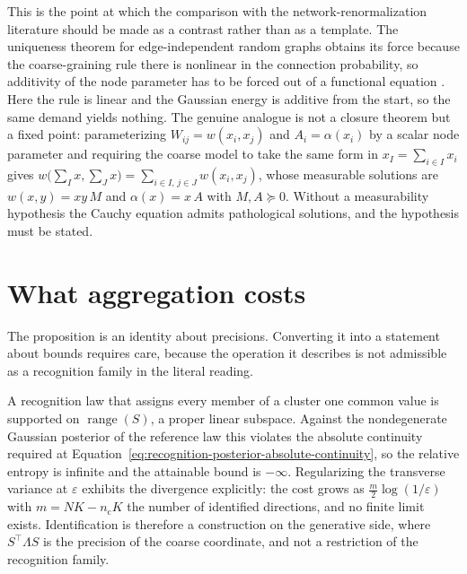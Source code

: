 This is the point at which the comparison with the network-renormalization literature should be made as a contrast rather than as a template. The uniqueness theorem for edge-independent random graphs obtains its force because the coarse-graining rule there is nonlinear in the connection probability, so additivity of the node parameter has to be forced out of a functional equation \citep{Garuccio2023Multiscale}. Here the rule is linear and the Gaussian energy is additive from the start, so the same demand yields nothing. The genuine analogue is not a closure theorem but a fixed point: parameterizing \(W_{ij}=w(x_i,x_j)\) and \(A_i=\alpha(x_i)\) by a scalar node parameter and requiring the coarse model to take the same form in \(x_I=\sum_{i\in I}x_i\) gives \(w\bigl(\sum_{I}x,\sum_{J}x\bigr)=\sum_{i\in I,\,j\in J}w(x_i,x_j)\), whose measurable solutions are \(w(x,y)=xy\,M\) and \(\alpha(x)=x\,A\) with \(M,A\succeq 0\). Without a measurability hypothesis the Cauchy equation admits pathological solutions, and the hypothesis must be stated.

\section{What aggregation costs}

The proposition is an identity about precisions. Converting it into a statement about bounds requires care, because the operation it describes is not admissible as a recognition family in the literal reading.

A recognition law that assigns every member of a cluster one common value is supported on \(\operatorname{range}(S)\), a proper linear subspace. Against the nondegenerate Gaussian posterior of the reference law this violates the absolute continuity required at Equation~\eqref{eq:recognition-posterior-absolute-continuity}, so the relative entropy is infinite and the attainable bound is \(-\infty\). Regularizing the transverse variance at \(\varepsilon\) exhibits the divergence explicitly: the cost grows as \(\tfrac{m}{2}\log(1/\varepsilon)\) with \(m=NK-n_{\mathrm{c}}K\) the number of identified directions, and no finite limit exists. Identification is therefore a construction on the generative side, where \(S^{\top}\Lambda S\) is the precision of the coarse coordinate, and not a restriction of the recognition family.

